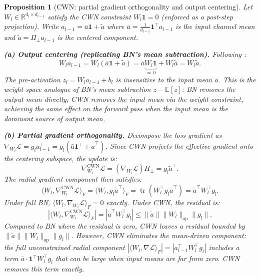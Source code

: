 \documentclass{article}
\providecommand{\R}{\mathbb{R}}
\providecommand{\E}{\mathbb{E}}
\providecommand{\norm}[1]{\lVert #1 \rVert}
\DeclareMathOperator{\tr}{tr}
\theoremstyle{plain}
\newtheorem{proposition}{Proposition}
\theoremstyle{definition}
\theoremstyle{remark}
\begin{document}
\begin{proposition}[CWN: partial gradient orthogonality and output centering]
\label{prop:cwn_orthogonality}
Let $W_l \in \R^{d_l \times d_{l-1}}$ satisfy the CWN constraint $W_l \mathbf{1} = 0$ (enforced as a post-step projection). Write $a_{l-1} = \bar{a}\mathbf{1} + \tilde{a}$ where $\bar{a} = \frac{1}{d_{l-1}}\mathbf{1}^\top a_{l-1}$ is the input channel mean and $\tilde{a} = \Pi_\perp a_{l-1}$ is the centered component.

\textbf{(a) Output centering (replicating BN's mean subtraction).} Following \citet{huang2017centered}:
\begin{equation}
\label{eq:cwn_zero_mean}
    W_l a_{l-1} = W_l(\bar{a}\mathbf{1} + \tilde{a}) = \bar{a}\underbrace{W_l\mathbf{1}}_{=\,0} + W_l\tilde{a} = W_l\tilde{a}.
\end{equation}
The pre-activation $z_l = W_l a_{l-1} + b_l$ is \emph{insensitive to the input mean} $\bar{a}$. This is the weight-space analogue of BN's mean subtraction $z - \E[z]$: BN removes the output mean directly; CWN removes the input mean via the weight constraint, achieving the same effect on the forward pass when the input mean is the dominant source of output mean.

\textbf{(b) Partial gradient orthogonality.} Decompose the loss gradient as $\nabla_{W_l}\mathcal{L} = g_l a_{l-1}^\top = g_l(\bar{a}\mathbf{1}^\top + \tilde{a}^\top)$. Since CWN projects the effective gradient onto the centering subspace, the update is:
\begin{equation}
    \nabla_{W_l}^{\mathrm{CWN}}\mathcal{L} = (\nabla_{W_l}\mathcal{L})\Pi_\perp = g_l\tilde{a}^\top.
\end{equation}
The radial gradient component then satisfies:
\begin{equation}
\label{eq:cwn_partial_orthogonality}
    \langle W_l, \nabla_{W_l}^{\mathrm{CWN}}\mathcal{L}\rangle_F = \langle W_l, g_l\tilde{a}^\top\rangle_F = \tr(W_l^\top g_l \tilde{a}^\top) = \tilde{a}^\top W_l^\top g_l.
\end{equation}
Under full BN, $\langle W_l, \nabla_{W_l}\mathcal{L}\rangle_F = 0$ exactly. Under CWN, the residual is:
\begin{equation}
\label{eq:cwn_residual}
    |\langle W_l, \nabla_{W_l}^{\mathrm{CWN}}\mathcal{L}\rangle_F| = |\tilde{a}^\top W_l^\top g_l| \leq \norm{\tilde{a}}\norm{W_l}_{\mathrm{op}}\norm{g_l}.
\end{equation}
Compared to BN where the residual is zero, CWN leaves a residual bounded by $\norm{\tilde{a}}\norm{W_l}_{\mathrm{op}}\norm{g_l}$. However, CWN \emph{eliminates the mean-driven component}: the full unconstrained radial component $|\langle W_l, \nabla\mathcal{L}\rangle_F| = |a_{l-1}^\top W_l^\top g_l|$ includes a term $\bar{a}\cdot\mathbf{1}^\top W_l^\top g_l$ that can be large when input means are far from zero. CWN removes this term exactly.


\end{proposition}
\end{document}
